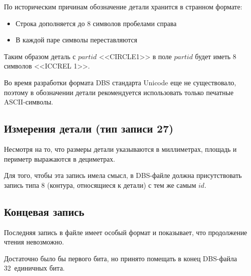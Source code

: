 
По историческим причинам обозначение детали хранится в странном формате:
\begin{itemize}
  \item
  Строка дополняется до 8 символов пробелами справа
  \item
  В каждой паре символы переставляются
\end{itemize}
Таким образом деталь с $partid$ <<CIRCLE1>>
в поле $partid$ будет иметь 8 символов
<<ICCREL 1>>.

Во время разработки формата DBS
стандарта Unicode еще не существовало,
поэтому в обозначении детали
рекомендуется использовать только
печатные ASCII-символы.

\subsection*{Измерения детали (тип записи 27)}


Несмотря на то, что размеры детали указываются в миллиметрах,
площадь и периметр выражаются в дециметрах.

Для того, чтобы эта запись имела смысл,
в DBS-файле должна присутствовать запись типа 8
(контура, относящиеся к детали)
с тем же самым $id$.

\subsection*{Концевая запись}
Последняя запись в файле имеет особый формат
и показывает,
что продолжение чтения невозможно.


Достаточно было бы первого бита,
но принято помещать в конец DBS-файла
32~единичных бита.


